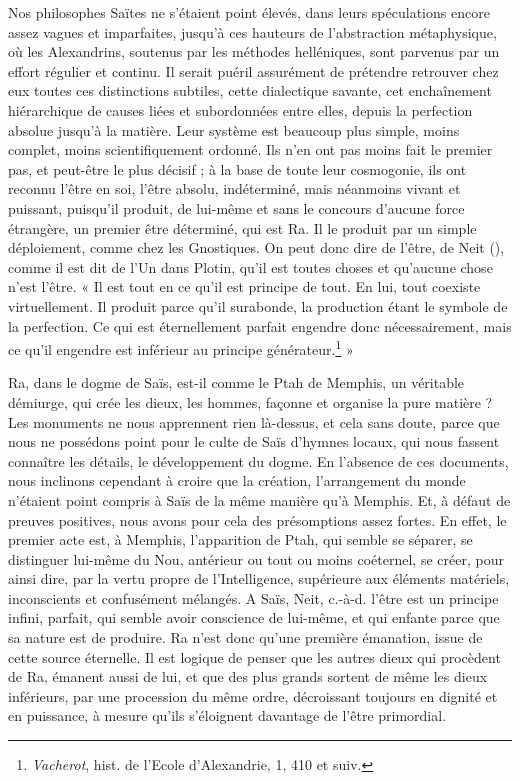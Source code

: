 \documentclass[letterpaper,twocolumn,openany,nodeprecatedcode]{dndbook}
\newcommand*\hieroAAAQ{}
\begin{document}
Nos philosophes Saïtes ne s'étaient point élevés, dans leurs spéculations encore assez vagues et imparfaites, jusqu'à ces hauteurs de l'abstraction métaphysique, où les Alexandrins, soutenus par les méthodes helléniques, sont parvenus par un effort régulier et continu. Il serait puéril assurément de prétendre retrouver chez eux toutes ces distinctions subtiles, cette dialectique savante, cet enchaînement hiérarchique de causes liées et subordonnées entre elles, depuis la perfection absolue jusqu'à la matière. Leur système est beaucoup plus simple, moins complet, moins scientifiquement ordonné. Ils n'en ont pas moins fait le premier pas, et peut-être le plus décisif ; à la base de toute leur cosmogonie, ils ont reconnu l'être en soi, l'être absolu, indéterminé, mais néanmoins vivant et puissant, puisqu'il produit, de lui-même et sans le concours d'aucune force étrangère, un premier être déterminé, qui est Ra. Il le produit par un simple déploiement, comme chez les Gnostiques. On peut donc dire de l'être, de Neit ($\hieroAAAQ$), comme il est dit de l'Un dans Plotin, qu'il est toutes choses et qu'aucune chose n'est l'être. « Il est tout en ce qu'il est principe de tout. En lui, tout coexiste virtuellement. Il produit parce qu’il surabonde, la production étant le symbole de la perfection. Ce qui est éternellement parfait engendre donc nécessairement, mais ce qu'il engendre est inférieur au principe générateur.\footnote{\emph{Vacherot}, hist. de l'Ecole d'Alexandrie, 1, 410 et suiv.} »

Ra, dans le dogme de Saïs, est-il comme le Ptah de Memphis, un véritable démiurge, qui crée les dieux, les hommes, façonne et organise la pure matière ? Les monuments ne nous apprennent rien là-dessus, et cela sans doute, parce que nous ne possédons point pour le culte de Saïs d'hymnes locaux, qui nous fassent connaître les détails, le développement du dogme. En l'absence de ces documents, nous inclinons cependant à croire que la création, l'arrangement du monde n'étaient point compris à Saïs de la même manière qu'à Memphis. Et, à défaut de preuves positives, nous avons pour cela des présomptions assez fortes. En effet, le premier acte est, à Memphis, l'apparition de Ptah, qui semble se séparer, se distinguer lui-même du Nou, antérieur ou tout ou moins coéternel, se créer, pour ainsi dire, par la vertu propre de l'Intelligence, supérieure aux éléments matériels, inconscients et confusément mélangés. A Saïs, Neit, c.-à-d. l'être est un principe infini, parfait, qui semble avoir conscience de lui-même, et qui enfante parce que sa nature est de produire. Ra n'est donc qu'une première émanation, issue de cette source éternelle. Il est logique de penser que les autres dieux qui procèdent de Ra, émanent aussi de lui, et que des plus grands sortent de même les dieux inférieurs, par une procession du même ordre, décroissant toujours en dignité et en puissance, à mesure qu'ils s'éloignent davantage de l'être primordial.
\end{document}
